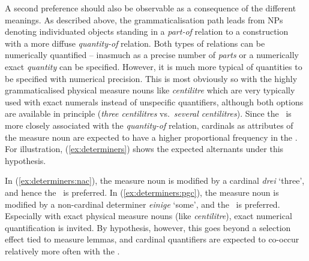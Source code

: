 A second preference should also be observable as a consequence of the different meanings.
As described above, the grammaticalisation path leads from NPs denoting individuated objects standing in a \textit{part-of} relation to a construction with a more diffuse \textit{quantity-of} relation.
Both types of relations can be numerically quantified -- inasmuch as a precise number of \textit{parts} or a numerically exact \textit{quantity} can be specified.
However, it is much more typical of quantities to be specified with numerical precision.
This is most obviously so with the highly grammaticalised physical measure nouns like \textit{centilitre} which are very typically used with exact numerals instead of unspecific quantifiers, although both options are available in principle (\textit{three centilitres} vs.\ \textit{several centilitres}).
Since the \NACa\ is more closely associated with the \textit{quantity-of} relation, cardinals as attributes of the measure noun are expected to have a higher proportional frequency in the \NACa.
For illustration, (\ref{ex:determiners}) shows the expected alternants under this hypothesis.

\begin{exe}
  \ex\label{ex:determiners} 
  \begin{xlist}
  \end{xlist}
\end{exe}

In (\ref{ex:determiners:nac}), the measure noun is modified by a cardinal \textit{drei} `three', and hence the \NACa\ is preferred.
In (\ref{ex:determiners:pgc}), the measure noun is modified by a non-cardinal determiner \textit{einige} `some', and the \PGCa\ is preferred.
Especially with exact physical measure nouns (like \textit{centilitre}), exact numerical quantification is invited.
By hypothesis, however, this goes beyond a selection effect tied to measure lemmas, and cardinal quantifiers are expected to co-occur relatively more often with the \NACa.

